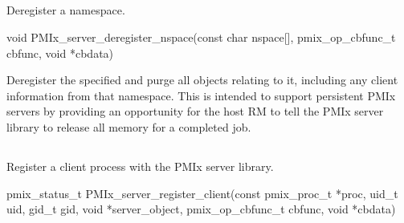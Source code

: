 \subsection{}

\summary

Deregister a namespace.

\format

\cspecificstart
\begin{codepar}
void PMIx_server_deregister_nspace(const char nspace[],
                                   pmix_op_cbfunc_t cbfunc, void *cbdata)
\end{codepar}
\cspecificend

\begin{arglist}
\end{arglist}

\descr

Deregister the specified  and purge all objects relating to it, including any client information from that namespace.
This is intended to support persistent PMIx servers by providing an opportunity for the host \ac{RM} to tell the PMIx server library to release all memory for a completed job.



\subsection{}

\summary

Register a client process with the PMIx server library.

\format

\cspecificstart
\begin{codepar}
pmix_status_t PMIx_server_register_client(const pmix_proc_t *proc,
                                          uid_t uid, gid_t gid,
                                          void *server_object,
                                          pmix_op_cbfunc_t cbfunc, void *cbdata)
\end{codepar}
\cspecificend

\begin{arglist}
\end{arglist}

